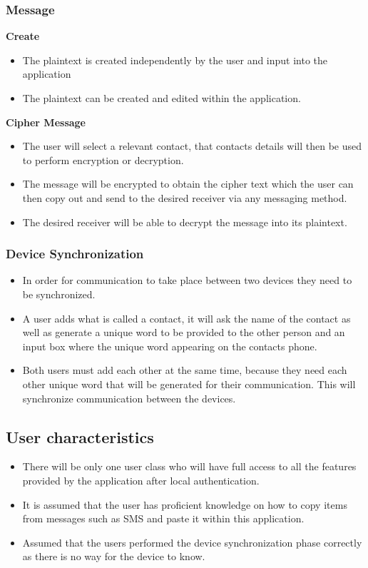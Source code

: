 \subsubsection{Message}
\textbf{Create}
\begin{itemize}
\item The plaintext is created independently by the user and input into the application
\item The plaintext can be created and edited within the application.
\end{itemize}
\textbf{Cipher Message}
\begin{itemize}
\item The user will select a relevant contact, that contacts details will then be used to perform encryption or decryption.\item The message will be encrypted to obtain the cipher text which the user can then copy out and send to the desired receiver via any messaging method.
\item The desired receiver will be able to decrypt the message into its plaintext.
\end{itemize}

\subsubsection{Device Synchronization}
\begin{itemize}
\item In order for communication to take place between two devices they need to be synchronized.
\item A user adds what is called a contact, it will ask the name of the contact as well as generate a unique word to be provided to the other person and an input box where the unique word appearing on the contacts phone.
\item Both users must add each other at the same time, because they need each other unique word that will be generated for their communication. This will synchronize communication between the devices.
\end{itemize}

\subsection{User characteristics}
\begin{itemize}
\item There will be only one user class who will have full access to all the features provided by the application after local authentication.
\item It is assumed that the user has proficient knowledge on how to copy items from messages such as SMS and paste it within this application.
\item Assumed that the users performed the device synchronization phase correctly as there is no way for the device to know.
\end{itemize}


